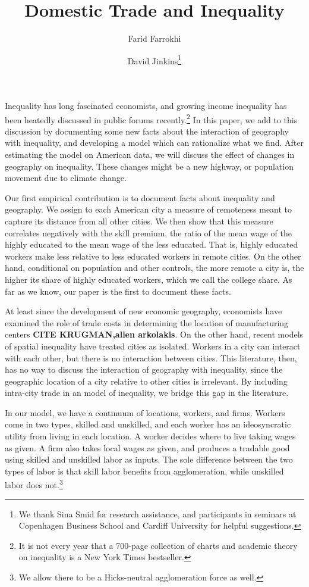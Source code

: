 \documentclass{article}
\title{Domestic Trade and Inequality}
\author[1]{Farid Farrokhi}
\author[2]{David Jinkins\thanks{We thank Sina Smid for research assistance, and participants in seminars at Copenhagen Business School and Cardiff University for helpful suggestions.}}
\affil[1]{Penn State}
\affil[2]{Copenhagen Business School}
\begin{document}
\maketitle

Inequality has long fascinated economists, and growing income inequality has been heatedly discussed in public forums recently.\footnote{It is not every year that a 700-page collection of charts and academic theory on inequality is a New York Times bestseller.}  In this paper, we add to this discussion by documenting some new facts about the interaction of geography with inequality, and developing a model which can rationalize what we find.  After estimating the model on American data, we will discuss the effect of changes in geography on inequality.  These changes might be a new highway, or population movement due to climate change.

Our first empirical contribution is to document facts about inequality and geography.  We assign to each American city a measure of remoteness meant to capture its distance from all other cities.  We then show that this measure correlates negatively with the skill premium, the ratio of the mean wage of the highly educated to the mean wage of the less educated.  That is, highly educated workers make less relative to less educated workers in remote cities.  On the other hand, conditional on population and other controls, the more remote a city is, the higher its share of highly educated workers, which we call the college share.  As far as we know, our paper is the first to document these facts.

At least since the development of new economic geography, economists have examined the role of trade costs in determining the location of manufacturing centers \textbf{CITE KRUGMAN,allen arkolakis}.  On the other hand, recent models of spatial inequality have treated cities as isolated.  Workers in a city can interact with each other, but there is no interaction between cities.  This literature, then, has no way to discuss the interaction of geography with inequality, since the geographic location of a city relative to other cities is irrelevant.  By including intra-city trade in an model of inequality, we bridge this gap in the literature.

In our model, we have a continuum of locations, workers, and firms.  Workers come in two types, skilled and unskilled, and each worker has an ideosyncratic utility from living in each location.  A worker decides where to live taking wages as given.  A firm also takes local wages as given, and produces a tradable good using skilled and unskilled labor as inputs.  The sole difference between the two types of labor is that skill labor benefits from agglomeration, while unskilled labor does not.\footnote{We allow there to be a Hicks-neutral agglomeration force as well.}
\end{document}
